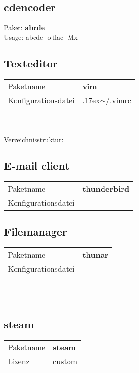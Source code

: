 \subsection{cdencoder}
Paket: \textbf{abcde}  \\ 
Usage: abcde -o flac -Mx

\subsection{Texteditor}
\begin{tabular}{l|l}
Paketname & \textbf{vim} \\ 
Konfigurationsdatei & {{\raise.17ex\hbox{$\scriptstyle\mathtt{\sim}$}}/.vimrc} \\
\end{tabular}
\\ \\
Verzeichnisstruktur:  

\subsection{E-mail client}
\begin{tabular}{l|l}
Paketname & \textbf{thunderbird} \\ 
Konfigurationsdatei & - \\
\end{tabular}

\subsection{Filemanager}
\begin{tabular}{l|l}
Paketname & \textbf{thunar} \\ 
Konfigurationsdatei & ~ \\
\end{tabular}
\\ \\

\subsection{steam}
\begin{tabular}{l|l}
Paketname & \textbf{steam} \\ 
Lizenz & custom \\
\end{tabular}
\\ \\ \\

